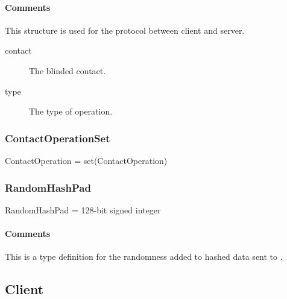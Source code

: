 \documentclass[a4paper,10pt]{article}
\begin{document}
\SpecialItem\paragraph*{Comments}
This structure is used for the protocol between client and server.

\begin{description}
 \item[contact] The blinded contact.
 \item[type] The type of operation.
\end{description}

\subsubsection{ContactOperationSet}

\begin{verbbox}
ContactOperation = set(ContactOperation)
\end{verbbox}
\begin{center}
\theverbbox
\end{center}

\begin{inparaitem}[ ]
 \item \unsecure
\end{inparaitem}

\subsubsection{RandomHashPad}

\begin{verbbox}
RandomHashPad = 128-bit signed integer
\end{verbbox}
\begin{center}
\theverbbox
\end{center}

\begin{inparaitem}[ ]
 \item \infrastructure
\end{inparaitem}

\paragraph*{Comments}
This is a type definition for the randomness added to hashed data sent to \Server{}.

\subsection{Client}
\label{sec:structure:client}
\end{document}

